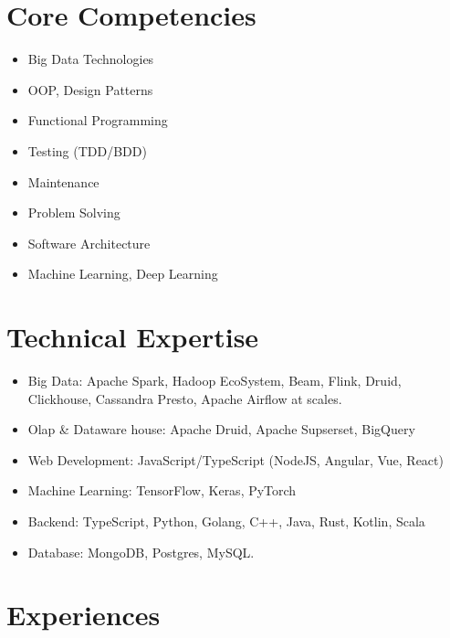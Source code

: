 \documentclass[letterpaper]{twentysecondcv} %
\begin{document}
\section{Core Competencies}
\begin{multicols}{2}
\begin{itemize}
	\item Big Data Technologies
	\item OOP, Design Patterns
	\item Functional Programming
	\item Testing (TDD/BDD)
	\item Maintenance
	\item Problem Solving
	\item Software Architecture
	\item Machine Learning, Deep Learning
\end{itemize}
\end{multicols}

\section{Technical Expertise}
\begin{itemize}
    \item Big Data: Apache Spark, Hadoop EcoSystem, Beam, Flink, Druid, Clickhouse, Cassandra Presto, Apache Airflow at scales.
    \item Olap & Dataware house: Apache Druid, Apache Supserset, BigQuery
	\item Web Development: JavaScript/TypeScript (NodeJS, Angular, Vue, React)
	\item Machine Learning: TensorFlow, Keras, PyTorch
	\item Backend: TypeScript, Python, Golang, C++, Java, Rust, Kotlin, Scala
	\item Database: MongoDB, Postgres, MySQL.
\end{itemize}


\section{Experiences}
\end{document}
